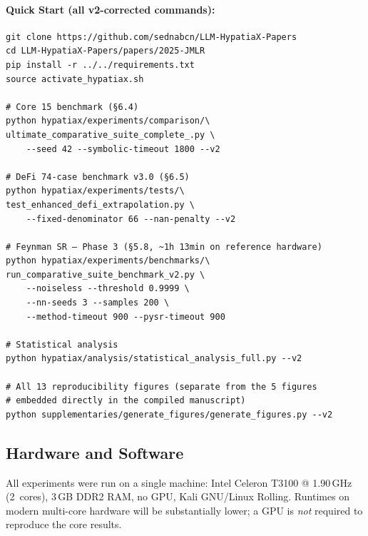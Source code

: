 \documentclass[11pt,a4paper]{article}
\begin{document}
\paragraph{Quick Start (all v2-corrected commands):}
\begin{small}
\begin{verbatim}
git clone https://github.com/sednabcn/LLM-HypatiaX-Papers
cd LLM-HypatiaX-Papers/papers/2025-JMLR
pip install -r ../../requirements.txt
source activate_hypatiax.sh

# Core 15 benchmark (§6.4)
python hypatiax/experiments/comparison/\
ultimate_comparative_suite_complete_.py \
    --seed 42 --symbolic-timeout 1800 --v2

# DeFi 74-case benchmark v3.0 (§6.5)
python hypatiax/experiments/tests/\
test_enhanced_defi_extrapolation.py \
    --fixed-denominator 66 --nan-penalty --v2

# Feynman SR — Phase 3 (§5.8, ~1h 13min on reference hardware)
python hypatiax/experiments/benchmarks/\
run_comparative_suite_benchmark_v2.py \
    --noiseless --threshold 0.9999 \
    --nn-seeds 3 --samples 200 \
    --method-timeout 900 --pysr-timeout 900

# Statistical analysis
python hypatiax/analysis/statistical_analysis_full.py --v2

# All 13 reproducibility figures (separate from the 5 figures
# embedded directly in the compiled manuscript)
python supplementaries/generate_figures/generate_figures.py --v2
\end{verbatim}
\end{small}

\subsection{Hardware and Software}

All experiments were run on a single machine: Intel Celeron T3100 @
1.90\,GHz (2~cores), 3\,GB DDR2 RAM, no GPU, Kali GNU/Linux Rolling.
Runtimes on modern multi-core hardware will be substantially lower; a GPU
is \emph{not} required to reproduce the core results.
\end{document}
